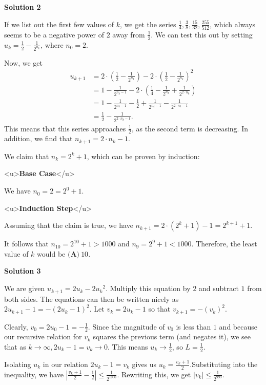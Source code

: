 \begin{enumerate}
\textbf{Solution 2}

If we list out the first few values of $k$, we get the series $\frac{1}{4}, \frac{3}{8}, \frac{15}{32}, \frac{255}{512}$, which always seems to be a negative power of $2$ away from $\frac{1}{2}$. We can test this out by setting $u_k=\frac{1}{2}-\frac{1}{2^{n_k}}$, where $n_0=2$.

 Now, we get
 \begin{align*} u_{k+1} &= 2\cdot\left(\frac{1}{2}-\frac{1}{2^{n_{k}}}\right)-2\cdot\left(\frac{1}{2}-\frac{1}{2^{n_{k}}}\right)^2 \\ &= 1-\frac{1}{2^{n_k - 1}}-2\cdot\left(\frac{1}{4}-\frac{1}{2^{n_k}}+\frac{1}{2^{2 \cdot n_k}}\right)\\ &= 1-\frac{1}{2^{n_k - 1}}-\frac{1}{2}+\frac{1}{2^{n_k-1}}-\frac{1}{2^{2 \cdot n_k-1}} \\ &= \frac{1}{2}-\frac{1}{2^{2 \cdot n_k-1}}. \end{align*}
This means that this series approaches $\frac{1}{2}$, as the second term is decreasing. In addition, we find that $n_{k+1}=2 \cdot n_k-1$. 

 We claim that $n_k = 2^k+1$, which can be proven by induction:

 <u>\textbf{Base Case}</u>

 We have $n_0=2=2^0+1$.

 <u>\textbf{Induction Step}</u>

 Assuming that the claim is true, we have $n_{k+1}=2 \cdot (2^k+1)-1=2^{k+1}+1$.

 It follows that $n_{10}=2^{10}+1>1000$ and $n_9=2^9+1<1000$. Therefore, the least value of $k$ would be $\boxed{\textbf{(A)}\: 10}$.

 



\textbf{Solution 3}

We are given $u_{k+1} = 2u_k - 2{u_k}^2$. Multiply this equation by $2$ and subtract $1$ from both sides. The equations can then be written nicely as $2u_{k+1} - 1 = -(2u_k-1)^2$. Let $v_k = 2u_k - 1$ so that $v_{k+1} = -(v_k)^2$.

 Clearly, $v_0 = 2u_0 - 1 = -\frac{1}{2}$. Since the magnitude of $v_0$ is less than $1$ and because our recursive relation for $v_k$ squares the previous term (and negates it), we see that as $k \rightarrow \infty, 2u_k - 1 = v_k \rightarrow 0$. This means $u_k \rightarrow \frac{1}{2}$, so $L = \frac{1}{2}$.

 Isolating $u_k$ in our relation $2u_k - 1 = v_k$ gives us $u_k = \frac{v_k + 1}{2}$.Substituting into the inequality, we have $\left|\frac{v_k + 1}{2}-\frac{1}{2}\right| \le \frac{1}{2^{1000}}$. Rewriting this, we get $|v_k| \le \frac{1}{2^{999}}$.


\end{enumerate}
